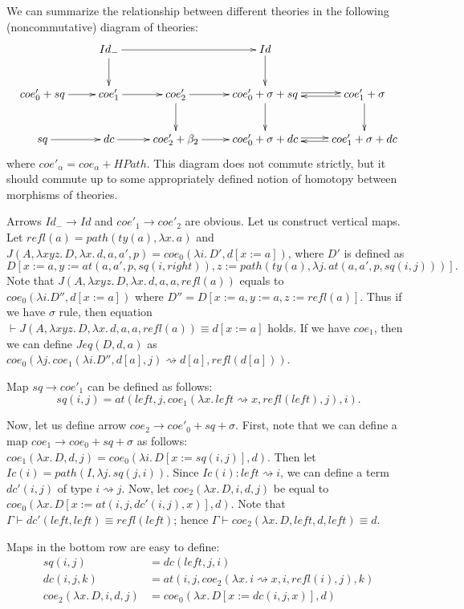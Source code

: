 \documentclass[reqno]{amsart}
\theoremstyle{definition}
\theoremstyle{remark}
\newcommand{\deq}{\equiv}
\newcommand{\repl}{:=}
\newcommand{\idtype}{\rightsquigarrow}
\numberwithin{figure}{section}
\begin{document}
We can summarize the relationship between different theories in the following (noncommutative) diagram of theories:
\[ \xymatrix{ & Id_- \ar[rr] \ar[d] & & Id \ar[d] \\
              coe'_0 + sq \ar[r] & coe'_1 \ar[r] & coe'_2 \ar[d]    \ar[r] & coe'_0 + \sigma + sq \ar@<1.5pt>[r] \ar[d] & coe'_1 + \sigma \ar[d] \ar@<1.5pt>[l] \\
              sq          \ar[r] & dc     \ar[r] & coe'_2 + \beta_2 \ar[r] & coe'_0 + \sigma + dc \ar@<1.5pt>[r]        & coe'_1 + \sigma + dc   \ar@<1.5pt>[l]
            } \]
where $coe'_\alpha = coe_\alpha + HPath$.
This diagram does not commute strictly, but it should commute up to some appropriately defined notion of homotopy between morphisms of theories.

Arrows $Id_- \to Id$ and $coe'_1 \to coe'_2$ are obvious.
Let us construct vertical maps.
Let $refl(a) = path(ty(a), \lambda x.\,a)$ and $J(A, \lambda x y z.\,D, \lambda x.\,d, a, a', p) = coe_0(\lambda i.\,D', d[x \repl a])$, where $D'$ is defined as
\[ D[x \repl a, y \repl at(a, a', p, sq(i,right)), z \repl path(ty(a), \lambda j.\,at(a, a', p, sq(i,j)))]. \]
Note that $J(A, \lambda x y z.\,D, \lambda x.\,d, a, a, refl(a))$ equals to $coe_0(\lambda i. D'', d[x \repl a])$ where $D'' = D[x \repl a, y \repl a, z \repl refl(a)]$.
Thus if we have $\sigma$ rule, then equation $\vdash J(A, \lambda x y z.\,D, \lambda x.\,d, a, a, refl(a)) \deq d[x \repl a]$ holds.
If we have $coe_1$, then we can define $Jeq(D,d,a)$ as $coe_0(\lambda j.\,coe_1(\lambda i. D'', d[a], j) \idtype d[a], refl(d[a]))$.

Map $sq \to coe'_1$ can be defined as follows:
\[ sq(i,j) = at(left, j, coe_1(\lambda x.\,left \idtype x, refl(left), j), i). \]

Now, let us define arrow $coe_2 \to coe'_0 + sq + \sigma$.
First, note that we can define a map $coe_1 \to coe_0 + sq + \sigma$ as follows: $coe_1(\lambda x.\,D, d, j) = coe_0(\lambda i.\,D[x \repl sq(i,j)], d)$.
Then let $Ic(i) = path(I, \lambda j.\,sq(j,i))$.
Since $Ic(i) : left \idtype i$, we can define a term $dc'(i,j)$ of type $i \idtype j$.
Now, let $coe_2(\lambda x.\,D, i, d, j)$ be equal to $coe_0(\lambda x.\,D[x \repl at(i, j, dc'(i,j), x)], d)$.
Note that $\Gamma \vdash dc'(left,left) \deq refl(left)$; hence $\Gamma \vdash coe_2(\lambda x.\,D, left, d, left) \deq d$.

Maps in the bottom row are easy to define:
\begin{align*}
sq(i,j) & = dc(left,j,i) \\
dc(i,j,k) & = at(i,j,coe_2(\lambda x.\,i \idtype x, i, refl(i), j),k) \\
coe_2(\lambda x.\,D, i, d, j) & = coe_0(\lambda x.\,D[x \repl dc(i,j,x)], d)
\end{align*}
\end{document}
